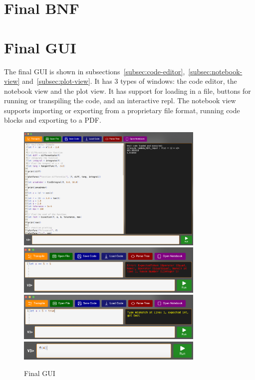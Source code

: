 \section{Final BNF}\label{sec:final-bnf}



\section{Final GUI}\label{sec:final-gui}

The final GUI is shown in subsections~\ref{subsec:code-editor},~\ref{subsec:notebook-view} and~\ref{subsec:plot-view}.
It has 3 types of windows: the code editor, the notebook view and the plot view.
It has support for loading in a file, buttons for running or transpiling the code, and an interactive repl.
The notebook view supports importing or exporting from a proprietary file format, running code blocks and exporting 
to a PDF\@.

\begin{figure}[H]
    \centering
    \includegraphics[width=0.8\textwidth]{assets/finalCodeEditor}
    \includegraphics[width=0.8\textwidth]{assets/finalGuiParserError}
    \includegraphics[width=0.8\textwidth]{assets/finalGuiTypeError}
    \includegraphics[width=0.8\textwidth]{assets/finalREPL}
    \caption{Final GUI}\label{fig:final-gui}
\end{figure}

